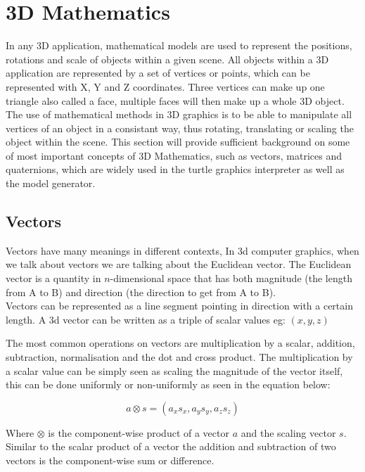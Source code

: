\section{3D Mathematics}

In any 3D application, mathematical models are used to represent the positions, rotations and scale of objects within a given scene. All objects within a 3D application are represented by a set of vertices or points, which can be represented with X, Y and Z coordinates. Three vertices can make up one triangle also called a face, multiple faces will then make up a whole 3D object. The use of mathematical methods in 3D graphics is to be able to manipulate all vertices of an object in a consistant way, thus rotating, translating or scaling the object within the scene. This section will provide sufficient background on some of most important concepts of 3D Mathematics, such as vectors, matrices and quaternions, which are widely used in the turtle graphics interpreter as well as the model generator.

\subsection{Vectors}

Vectors have many meanings in different contexts, In \acrshort{3d} computer graphics, when we talk about vectors we are talking about the Euclidean vector. The Euclidean vector is a quantity in $n$-dimensional space that has both magnitude (the length from A to B) and direction (the direction to get from A to B). \\
Vectors can be represented as a line segment pointing in direction with a certain length. A \acrshort{3d} vector can be written as a triple of scalar values eg: $(x, y, z)$

The most common operations on vectors are multiplication by a scalar, addition, subtraction, normalisation and the dot and cross product. The multiplication by a scalar value can be simply seen as scaling the magnitude of the vector itself, this can be done uniformly or non-uniformly as seen in the equation below:

\begin{equation}
a \otimes s = (a_x s_x, a_y s_y, a_z s_z)
\end{equation}

\noindent
Where $\otimes$ is the component-wise product of a vector $a$ and the scaling vector $s$. Similar to the scalar product of a vector the addition and subtraction of two vectors is the component-wise sum or difference. 

